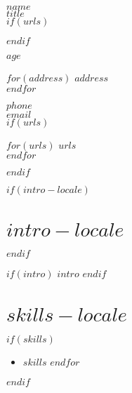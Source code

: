 \documentclass[$fontsize$, a4paper]{article}
\begin{document}
{\LARGE \textbf{$name$}}\\[.2cm]
{\LARGE $title$}\\[.2cm]

$if(urls)$
\begin{multicols}{2}
$endif$


\textbf{$age$}\\

\vspace{-10pt}

$for(address)$
$address$\\
$endfor$

\vspace{-10pt}

$phone$\\
\href{mailto:$email$}{$email$}\\


$if(urls)$
\columnbreak

$for(urls)$
\href{http://$urls$}{$urls$}\\
$endfor$
\end{multicols}
$endif$

\vspace{15pt}

$if(intro-locale)$
\section*{$intro-locale$}
$endif$

$if(intro)$
$intro$
$endif$


\section*{$skills-locale$}
$if(skills)$
\begin{itemize}
    $for(skills)$
      \item $skills$
    $endfor$
\end{itemize}
$endif$


\vspace{10pt}
\end{document}
